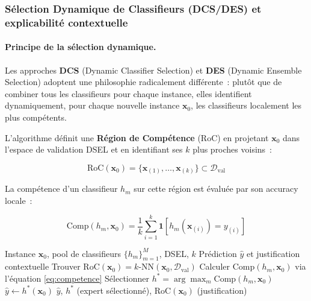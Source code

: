 \subsubsection{Sélection Dynamique de Classifieurs (DCS/DES) et explicabilité contextuelle}

\paragraph{Principe de la sélection dynamique.}

Les approches \textbf{DCS} (Dynamic Classifier Selection) et \textbf{DES} (Dynamic Ensemble
Selection) adoptent une philosophie radicalement différente~: plutôt que de combiner tous
les classifieurs pour chaque instance, elles identifient dynamiquement, pour chaque
nouvelle instance $\mathbf{x}_0$, les classifieurs localement les plus compétents.

L'algorithme définit une \textbf{Région de Compétence} (RoC) en projetant $\mathbf{x}_0$ dans
l'espace de validation DSEL et en identifiant ses $k$ plus proches voisins~:

\begin{equation}
  \mathrm{RoC}(\mathbf{x}_0) = \bigl\{\mathbf{x}_{(1)}, \ldots, \mathbf{x}_{(k)}\bigr\}
  \subset \mathcal{D}_{\text{val}}
  \label{eq:roc}
\end{equation}

La compétence d'un classifieur $h_m$ sur cette région est évaluée par son accuracy locale~:

\begin{equation}
  \mathrm{Comp}(h_m, \mathbf{x}_0) = \frac{1}{k} \sum_{i=1}^{k}
  \mathbf{1}\!\left[h_m(\mathbf{x}_{(i)}) = y_{(i)}\right]
  \label{eq:competence}
\end{equation}

\begin{algorithm}[H]
\caption{Overall Local Accuracy (OLA) — DCS avec explicabilité}
\begin{algorithmic}[1]
\Require Instance $\mathbf{x}_0$, pool de classifieurs $\{h_m\}_{m=1}^M$, DSEL, $k$
\Ensure Prédiction $\hat{y}$ et justification contextuelle
\State Trouver $\mathrm{RoC}(\mathbf{x}_0) = k\text{-NN}(\mathbf{x}_0, \mathcal{D}_{\text{val}})$
    \State Calculer $\mathrm{Comp}(h_m, \mathbf{x}_0)$ via l'équation \eqref{eq:competence}
\EndFor
\State Sélectionner $h^* = \arg\max_m \mathrm{Comp}(h_m, \mathbf{x}_0)$
\State $\hat{y} \leftarrow h^*(\mathbf{x}_0)$
\State \Return $\hat{y}$, $h^*$ (expert sélectionné), $\mathrm{RoC}(\mathbf{x}_0)$ (justification)
\end{algorithmic}
\end{algorithm}

